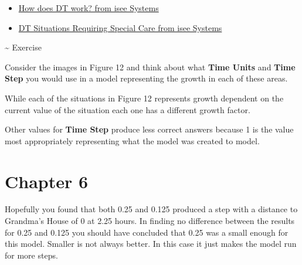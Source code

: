 \documentclass[]{memoir}
\renewcommand{\u}[1]{\textbf{#1}}
\begin{document}
\begin{itemize}
\itemsep1pt\parskip0pt
\item
  \href{http://www.iseesystems.com/Helpv9/Content/DT/How_does_DT_work_.htm}{How
  does DT work? from isee Systems}
\item
  \href{http://www.iseesystems.com/Helpv9/Content/DT/DT_Special_Care.htm}{DT
  Situations Requiring Special Care from isee Systems}
\end{itemize}

\textasciitilde{} Exercise

Consider the images in Figure 12 and think about what \u{Time Units} and
\u{Time Step} you would use in a model representing the growth in each
of these areas.


While each of the situations in Figure 12 represents growth dependent on
the current value of the situation each one has a different growth
factor.


Other values for \u{Time Step} produce less correct answers because 1 is
the value most appropriately representing what the model was created to
model.

\section{Chapter 6}


Hopefully you found that both 0.25 and 0.125 produced a step with a
distance to Grandma's House of 0 at 2.25 hours. In finding no difference
between the results for 0.25 and 0.125 you should have concluded that
0.25 was a small enough for this model. Smaller is not always better. In
this case it just makes the model run for more steps.
\end{document}
